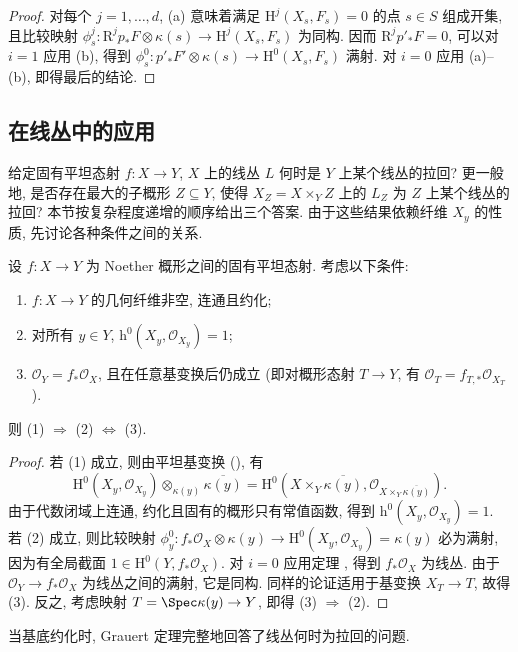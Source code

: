 \begin{proof}
对每个 $j=1,\ldots,d$, (a) 意味着满足 $\mathrm H^j(X_s,F_s)=0$ 的点 $s\in S$ 组成开集, 且比较映射 $\phi_s^j:\mathrm R^jp_*F\otimes\kappa(s)\to\mathrm H^j(X_s,F_s)$ 为同构. 因而 $\mathrm R^jp'_*F=0$, 可以对 $i=1$ 应用 (b), 得到 $\phi_s^0:p'_*F'\otimes\kappa(s)\to\mathrm H^0(X_s,F_s)$ 满射. 对 $i=0$ 应用 (a)--(b), 即得最后的结论.
\end{proof}

\subsection{在线丛中的应用}\label{src:A.6.3-subsection}
给定固有平坦态射 $f:X\to Y$, $X$ 上的线丛 $L$ 何时是 $Y$ 上某个线丛的拉回? 更一般地, 是否存在最大的子概形 $Z\subseteq Y$, 使得 $X_Z=X\times_Y Z$ 上的 $L_Z$ 为 $Z$ 上某个线丛的拉回? 本节按复杂程度递增的顺序给出三个答案. 由于这些结果依赖纤维 $X_y$ 的性质, 先讨论各种条件之间的关系.
\begin{lemma}\label{src:A.6.13}
设 $f:X\to Y$ 为 Noether 概形之间的固有平坦态射. 考虑以下条件:
\begin{enumerate}[(1)]
\item $f:X\to Y$ 的几何纤维非空, 连通且约化;
\item 对所有 $y\in Y$, $\mathrm h^0(X_y,\mathcal O_{X_y})=1$;
\item $\mathcal O_Y=f_*\mathcal O_X$, 且在任意基变换后仍成立 (即对概形态射 $T\to Y$, 有 $\mathcal O_T=f_{T,*}\mathcal O_{X_T}$).
\end{enumerate}
则 (1) $\Rightarrow$ (2) $\Longleftrightarrow$ (3).
\end{lemma}
\begin{proof}
若 (1) 成立, 则由平坦基变换 (), 有
\[
\mathrm H^0(X_y,\mathcal O_{X_y})\otimes_{\kappa(y)}\overline{\kappa(y)}=\mathrm H^0(X\times_Y\overline{\kappa(y)},\mathcal O_{X\times_Y\overline{\kappa(y)}}).
\]
由于代数闭域上连通, 约化且固有的概形只有常值函数, 得到 $\mathrm h^0(X_y,\mathcal O_{X_y})=1$. 若 (2) 成立, 则比较映射 $\phi_y^0:f_*\mathcal O_X\otimes\kappa(y)\to\mathrm H^0(X_y,\mathcal O_{X_y})=\kappa(y)$ 必为满射, 因为有全局截面 $1\in\mathrm H^0(Y,f_*\mathcal O_X)$. 对 $i=0$ 应用定理 , 得到 $f_*\mathcal O_X$ 为线丛. 由于 $\mathcal O_Y\to f_*\mathcal O_X$ 为线丛之间的满射, 它是同构. 同样的论证适用于基变换 $X_T\to T$, 故得 (3). 反之, 考虑映射 $T=\Spec\kappa(y)\to Y$, 即得 (3) $\Rightarrow$ (2).
\end{proof}
当基底约化时, Grauert 定理完整地回答了线丛何时为拉回的问题.
